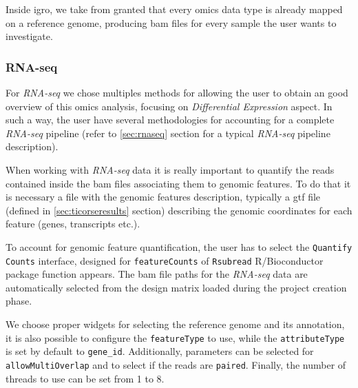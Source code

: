 Inside \gls{igro}, we take from granted that every omics data type is already mapped on a reference genome, producing \gls{bam} files for every sample the user wants to investigate.


\subsubsection{RNA-seq} \label{sec:integrhorna}
For \textit{RNA-seq} we chose multiples methods for allowing the user to obtain an good overview of this omics analysis, focusing on \textit{Differential Expression} aspect.
In such a way, the user have several methodologies for accounting for a complete \textit{RNA-seq} pipeline (refer to \ref{sec:rnaseq} section for a typical \textit{RNA-seq} pipeline description).



When working with \textit{RNA-seq} data it is really important to quantify the reads contained inside the \gls{bam} files associating them to genomic features.
To do that it is necessary a file with the genomic features description, typically a \gls{gtf} file (defined in \ref{sec:ticorseresults} section) describing the genomic coordinates for each feature (genes, transcripts etc.).

To account for genomic feature quantification, the user has to select the \lstinline!Quantify Counts! interface, designed for \lstinline!featureCounts! of \lstinline!Rsubread! R/Bioconductor package function \cite{Liao2014} appears.
The  \gls{bam} file paths for the \textit{RNA-seq} data are automatically selected from the design matrix loaded during the project creation phase.

We choose proper widgets for selecting the reference genome and its annotation, it is also possible to configure the \lstinline!featureType! to use, while the \lstinline!attributeType! is set by default to \lstinline!gene_id!.
Additionally, parameters can be selected for \lstinline!allowMultiOverlap! and to select if the reads are \lstinline!paired!.
Finally, the number of threads to use can be set from 1 to 8.

